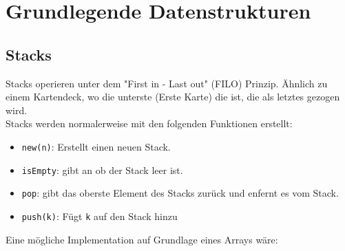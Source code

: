 \documentclass[
../../AuD-Zusammenfassung.tex,
]
{subfiles}
\begin{document}
\section{Grundlegende Datenstrukturen}
\subsection{Stacks}
Stacks operieren unter dem "First in - Last out" (FILO) Prinzip. Ähnlich zu einem Kartendeck, wo die unterste (Erste Karte) die ist, die als letztes gezogen wird. \\
Stacks werden normalerweise mit den folgenden Funktionen erstellt:
\begin{itemize}
    \item \texttt{new(n)}: Erstellt einen neuen Stack.
    \item \texttt{isEmpty}: gibt an ob der Stack leer ist.
    \item \texttt{pop}: gibt das oberste Element des Stacks zurück und enfernt es vom Stack.
    \item \texttt{push(k)}: Fügt \texttt{k} auf den Stack hinzu
\end{itemize}
Eine mögliche Implementation auf Grundlage eines Arrays wäre:

\end{document}
